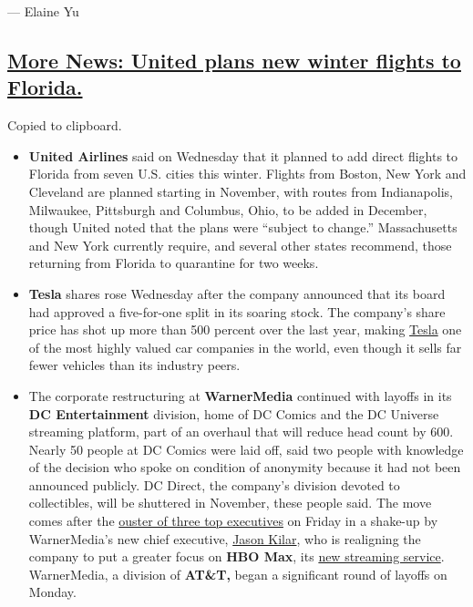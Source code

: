 --- Elaine Yu

\hypertarget{more-news-united-plans-new-winter-flights-to-florida}{%
\subsection{\texorpdfstring{\protect\hyperlink{more-news-united-plans-new-winter-flights-to-florida}{More
News: United plans new winter flights to
Florida.}}{More News: United plans new winter flights to Florida.}}\label{more-news-united-plans-new-winter-flights-to-florida}}

Copied to clipboard.

\begin{itemize}
\item
  \textbf{United Airlines} said on Wednesday that it planned to add
  direct flights to Florida from seven U.S. cities this winter. Flights
  from Boston, New York and Cleveland are planned starting in November,
  with routes from Indianapolis, Milwaukee, Pittsburgh and Columbus,
  Ohio, to be added in December, though United noted that the plans were
  ``subject to change.'' Massachusetts and New York currently require,
  and several other states recommend, those returning from Florida to
  quarantine for two weeks.
\item
  \textbf{Tesla} shares rose Wednesday after the company announced that
  its board had approved a five-for-one split in its soaring stock. The
  company's share price has shot up more than 500 percent over the last
  year, making
  \href{https://www.nytimes3xbfgragh.onion/live/2020/08/11/business/stock-market-today-coronavirus\#states-and-companies-are-confused-by-the-unemployment-and-tax-holiday-declarations}{Tesla}
  one of the most highly valued car companies in the world, even though
  it sells far fewer vehicles than its industry peers.
\item
  The corporate restructuring at \textbf{WarnerMedia} continued with
  layoffs in its \textbf{DC Entertainment} division, home of DC Comics
  and the DC Universe streaming platform, part of an overhaul that will
  reduce head count by 600. Nearly 50 people at DC Comics were laid off,
  said two people with knowledge of the decision who spoke on condition
  of anonymity because it had not been announced publicly. DC Direct,
  the company's division devoted to collectibles, will be shuttered in
  November, these people said. The move comes after the
  \href{https://www.nytimes3xbfgragh.onion/2020/08/07/business/media/hbo-warnermedia-executive-departure.html}{ouster
  of three top executives} on Friday in a shake-up by WarnerMedia's new
  chief executive,
  \href{https://www.nytimes3xbfgragh.onion/2020/04/01/business/media/warner-media-jason-kilar-john-stankey.html}{Jason
  Kilar}, who is realigning the company to put a greater focus on
  \textbf{HBO Max}, its
  \href{https://www.nytimes3xbfgragh.onion/2020/05/26/business/media/hbo-max-netflix-streaming.html}{new
  streaming service}. WarnerMedia, a division of \textbf{AT\&T,} began a
  significant round of layoffs on Monday.
\end{itemize}

